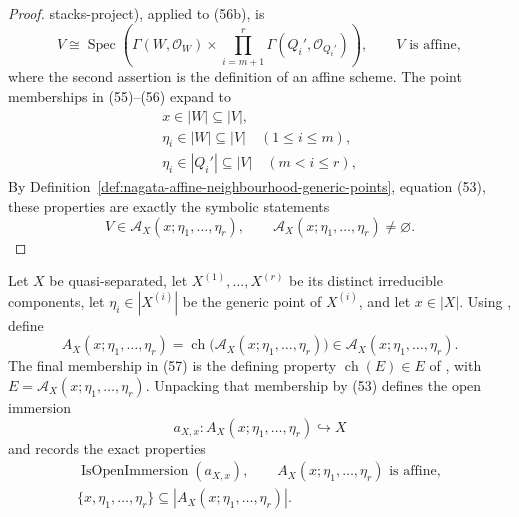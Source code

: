 \begin{proof}
  {stacks-project}), applied to (56b), is
  \[
    V\cong
      \operatorname{Spec}\left(
        \Gamma(W,\mathcal O_W)
          \times\prod_{i=m+1}^r\Gamma(Q_i',\mathcal O_{Q_i'})
      \right),
    \qquad V\text{ is affine},
  \]
  where the second assertion is the definition of an affine scheme.  The
  point memberships in (55)--(56) expand to
  \[
  \begin{gathered}
    x\in|W|\subseteq|V|,\\
    \eta_i\in|W|\subseteq|V|\quad(1\leq i\leq m),\\
    \eta_i\in|Q_i'|\subseteq|V|\quad(m<i\leq r),
  \end{gathered}
  \]
  By Definition~\ref{def:nagata-affine-neighbourhood-generic-points},
  equation (53), these properties are exactly the symbolic statements
  \[
    V\in\mathscr A_X(x;\eta_1,\ldots,\eta_r),
    \qquad
    \mathscr A_X(x;\eta_1,\ldots,\eta_r)\neq\varnothing.
  \]
\end{proof}

\begin{definition}
  \label{def:nagata-selected-affine-neighbourhood-generic-points}
  
  Let \(X\) be quasi-separated, let
  \(X^{(1)},\ldots,X^{(r)}\) be its distinct irreducible components, let
  \(\eta_i\in|X^{(i)}|\) be the generic point of \(X^{(i)}\), and let
  \(x\in|X|\).  Using
  , define
  \[
    A_X(x;\eta_1,\ldots,\eta_r)
      =
      \operatorname{ch}\bigl(
        \mathscr A_X(x;\eta_1,\ldots,\eta_r)
      \bigr)
      \in\mathscr A_X(x;\eta_1,\ldots,\eta_r).                    \tag{57}
  \]
  The final membership in (57) is the defining property
  $\operatorname{ch}(E)\in E$ of , with
  $E=\mathscr A_X(x;\eta_1,\ldots,\eta_r)$.  Unpacking that membership by
  (53) defines the open immersion
  \[
    a_{X,x}\colon A_X(x;\eta_1,\ldots,\eta_r)\hookrightarrow X
  \]
  and records the exact properties
  \[
  \begin{gathered}
    \operatorname{IsOpenImmersion}(a_{X,x}),\qquad
    A_X(x;\eta_1,\ldots,\eta_r)\text{ is affine},\\
    \{x,\eta_1,\ldots,\eta_r\}
      \subseteq|A_X(x;\eta_1,\ldots,\eta_r)|.
  \end{gathered}
  \]
\end{definition}

